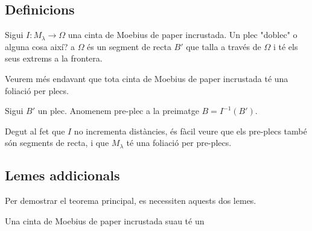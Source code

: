 \subsection{Definicions}
\begin{defi}
    Sigui $I:M_\lambda\to\Omega$ una cinta de Moebius de paper incrustada. Un {\normalfont plec} {\color{blue} "doblec" o alguna cosa així?} a $\Omega$ és un segment de recta $B'$ que talla a través de $\Omega$ i té els seus extrems a la frontera.
\end{defi}
Veurem més endavant que tota cinta de Moebius de paper incrustada té una foliació per plecs.
\begin{defi}
    Sigui $B'$ un plec. Anomenem {\normalfont pre-plec} a la preimatge $B=I^{-1}(B')$.
\end{defi}
Degut al fet que $I$ no incrementa distàncies, és fàcil veure que els pre-plecs també són segments de recta, i que $M_\lambda$ té una foliació per pre-plecs.

\subsection{Lemes addicionals}
Per demostrar el teorema principal, es necessiten aquests dos lemes.
\begin{lema}[T]\label{lema T}
    Una cinta de Moebius de paper incrustada suau té un  

\end{lema}
\newpage